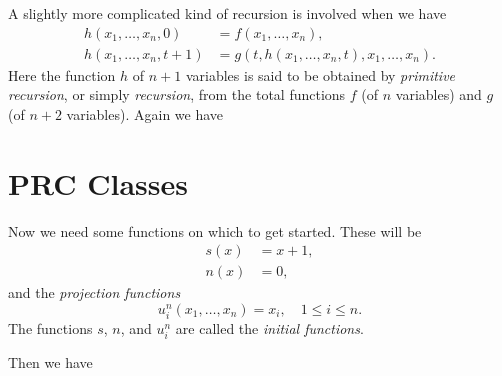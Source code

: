 \documentclass[12pt,a4paper,twoside,openany]{book}
\begin{document}

A slightly more complicated kind of recursion is involved when we have
\begin{equation}
    \begin{aligned}h(x_1,\ldots,x_n,0)&=f(x_1,\ldots,x_n),\\h(x_1,\ldots,x_n,t+1)&=g(t,h(x_1,\ldots,x_n,t),x_1,\ldots,x_n).\end{aligned}
    \label{2.2}
\end{equation}
Here the function $h$ of $n+1$ variables is said to be obtained by \textit{primitive recursion}, or simply \textit{recursion}, from the total functions $f$ (of $n$ variables) and $g$ (of $n+2$ variables). Again we have


\section{PRC Classes}

Now we need some functions on which to get started. These will be $$\begin{aligned}s(x)&=x+1,\\n(x)&=0,\end{aligned}$$ and the \textit{projection functions} $$u_i^n(x_1,\ldots,x_n)=x_i,\quad1\le i\le n.$$ The functions $s$, $n$, and $u_i^n$ are called the \textit{initial functions}.


Then we have


\end{document}
